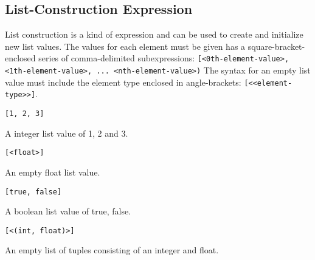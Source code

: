 
\subsection{List-Construction Expression}
{
	List construction is a kind of expression and can be
	used to create and initialize new list values.
	The values for each element must be given has a square-bracket-enclosed
	series of comma-delimited
	subexpressions: \texttt{[<0th-element-value>, <1th-element-value>, ... <nth-element-value>)}
	The syntax for an empty list value must include the element type enclosed
	in angle-brackets: \texttt{[<<element-type>>]}.
	
	\begin{itemize}
	{
		\item[] \texttt{[1, 2, 3]}
		
			A integer list value of 1, 2 and 3.
		
		\item[] \texttt{[<float>]}
		
			An empty float list value.
		
		\item[] \texttt{[true, false]}
		
			A boolean list value of true, false.
		
		\item[] \texttt{[<(int, float)>]}
		
			An empty list of tuples consisting of an integer and float.
	}
	\end{itemize}
}
